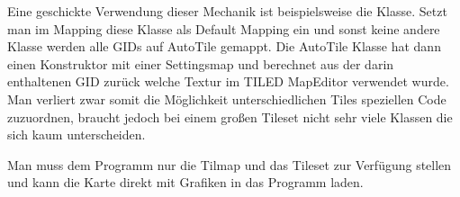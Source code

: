 Eine geschickte Verwendung dieser Mechanik ist beispielsweise die  Klasse. Setzt man im Mapping diese Klasse als Default Mapping ein und sonst keine andere Klasse werden alle GIDs auf AutoTile gemappt. Die AutoTile Klasse hat dann einen Konstruktor mit einer Settingsmap und berechnet aus der darin enthaltenen GID zurück welche Textur im TILED MapEditor verwendet wurde. Man verliert zwar somit die Möglichkeit unterschiedlichen Tiles speziellen Code zuzuordnen, braucht jedoch bei einem großen Tileset nicht sehr viele Klassen die sich kaum unterscheiden. %

Man muss dem Programm nur die Tilmap und das Tileset zur Verfügung stellen und kann die Karte direkt mit Grafiken in das Programm laden.